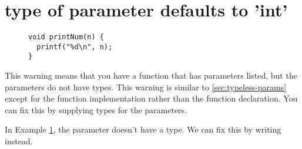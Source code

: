 \section{type of parameter defaults to 'int'}\label{sec:default-param-type}

\begin{figure}[htb]
\begin{lstlisting}
void printNum(n) {
  printf("%d\n", n);
}
\end{lstlisting}
\label{ex:default-param-type}
\end{figure}

This warning means that you have a function that has parameters listed, but the parameters do not have types.
This warning is similar to \ref{sec:typeless-params} except for the function implementation rather than the function declaration.
You can fix this by supplying types for the parameters.

In Example \ref{ex:default-param-type}, the parameter  doesn't have a type.
We can fix this by writing  instead.
\newpage